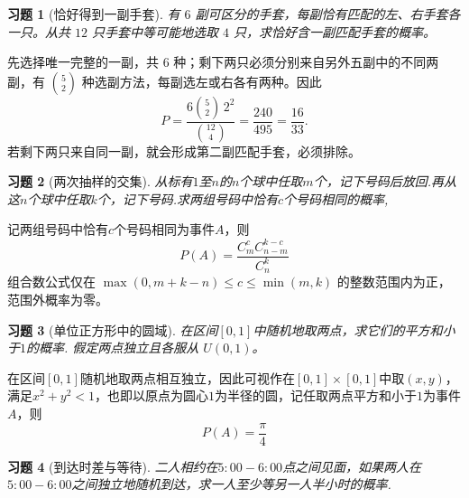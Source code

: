 \documentclass[UTF8,12pt,a4paper,fontset=fandol]{ctexart}
\newtheorem{exercise}{习题}[section]
\begin{document}
\begin{exercise}[恰好得到一副手套]\label{q:Y1.9}
有 $6$ 副可区分的手套，每副恰有匹配的左、右手套各一只。从共 $12$ 只手套中等可能地选取 $4$ 只，求恰好含一副匹配手套的概率。\par{}
\end{exercise}

\begin{solve}\label{a:Y1.9}先选择唯一完整的一副，共 $6$ 种；剩下两只必须分别来自另外五副中的不同两副，有 $\binom52$ 种选副方法，每副选左或右各有两种。因此\[P=\frac{6\binom52\,2^2}{\binom{12}4}=\frac{240}{495}=\frac{16}{33}.\]若剩下两只来自同一副，就会形成第二副匹配手套，必须排除。\end{solve}

\begin{exercise}[两次抽样的交集]\label{q:Y1.10}
从标有$1$至$n$的$n$个球中任取$m$个，记下号码后放回.再从这$n$个球中任取$k$个，记下号码.求两组号码中恰有$c$个号码相同的概率,\par{}
\end{exercise}

\begin{solve}\label{a:Y1.10}
记两组号码中恰有$c$个号码相同为事件$A$，则
\[P(A) = \frac{{C_m^cC_{n - m}^{k - c}}}{{C_n^k}}\]
 组合数公式仅在 $\max(0,m+k-n)\le c\le\min(m,k)$ 的整数范围内为正，范围外概率为零。\end{solve}

\begin{exercise}[单位正方形中的圆域]\label{q:Y1.11}
在区间$[0,1]$中随机地取两点，求它们的平方和小于$1$的概率. 假定两点独立且各服从 $U(0,1)$。\par{}
\end{exercise}

\begin{solve}\label{a:Y1.11}
在区间$[0,1]$随机地取两点相互独立，因此可视作在$[0,1]\times [0,1]$中取$(x,y)$，满足$x^2+y^2<1$，也即以原点为圆心$1$为半径的圆，记任取两点平方和小于$1$为事件$A$，则
\[
P(A)=\frac{\pi}{4}
\]
\end{solve}

\begin{exercise}[到达时差与等待]\label{q:Y1.12}
二人相约在$5:00-6:00$点之间见面，如果两人在$5:00-6:00$之间独立地随机到达，求一人至少等另一人半小时的概率.\par{}
\end{exercise}
\end{document}

